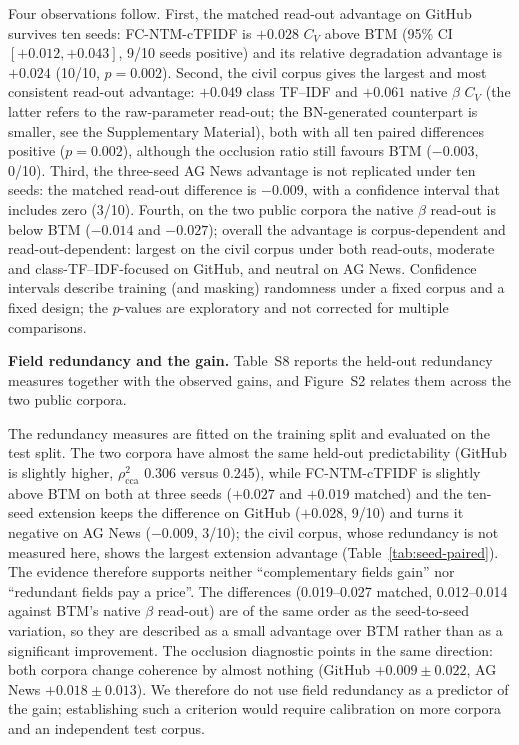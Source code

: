 \documentclass[Journal,letterpaper,NoLists]{ascelike-new}
\newcommand{\fcntm}{FC-NTM}
\begin{document}
Four observations follow. First, the matched read-out advantage on GitHub survives ten seeds:
\fcntm{}-cTFIDF is $+0.028$ $C_V$ above BTM (95\% CI $[+0.012,+0.043]$, 9/10 seeds positive) and
its relative degradation advantage is $+0.024$ (10/10, $p=0.002$). Second, the civil corpus gives
the largest and most consistent read-out advantage: $+0.049$ class TF--IDF and $+0.061$ native
$\beta$ $C_V$ (the latter refers to the raw-parameter read-out; the BN-generated counterpart
is smaller, see the Supplementary Material), both with all ten paired differences positive
($p=0.002$), although the occlusion
ratio still favours BTM ($-0.003$, 0/10). Third, the three-seed AG News advantage is not replicated under ten seeds: the matched read-out difference is $-0.009$, with a confidence interval that includes zero (3/10). Fourth, on the
two public corpora the native $\beta$ read-out is below BTM ($-0.014$ and $-0.027$); overall the
advantage is corpus-dependent and read-out-dependent: largest on the civil corpus under both
read-outs, moderate and class-TF--IDF-focused on GitHub, and neutral on AG News. Confidence intervals
describe training (and masking) randomness under a fixed corpus and a fixed design; the $p$-values
are exploratory and not corrected for multiple comparisons.

\noindent\textbf{Field redundancy and the gain.} Table~S8 reports the held-out redundancy measures together with the observed
gains, and Figure~S2 relates them across the two public corpora.

The redundancy measures are fitted on the training split and evaluated on the test split. The two
corpora have almost the same held-out predictability (GitHub is slightly higher,
$\rho^2_{\mathrm{cca}}$ 0.306 versus 0.245), while \fcntm{}-cTFIDF is slightly above BTM on both at
three seeds ($+0.027$ and $+0.019$ matched) and the ten-seed extension keeps the difference on
GitHub ($+0.028$, 9/10) and turns it negative on AG News ($-0.009$, 3/10); the civil corpus,
whose redundancy is not measured here, shows the largest extension advantage
(Table~\ref{tab:seed-paired}). The evidence
therefore supports neither ``complementary fields gain'' nor ``redundant fields pay a price''. The
differences (0.019--0.027 matched, 0.012--0.014 against BTM's native $\beta$ read-out) are of the
same order as the seed-to-seed variation, so they are described as a small advantage over BTM
rather than as a significant improvement. The occlusion diagnostic
points in the same direction: both corpora change coherence by almost nothing
(GitHub $+0.009\pm0.022$, AG News $+0.018\pm0.013$). We therefore do not use field redundancy as a
predictor of the gain; establishing such a criterion would require calibration on more corpora and
an independent test corpus.
\end{document}
